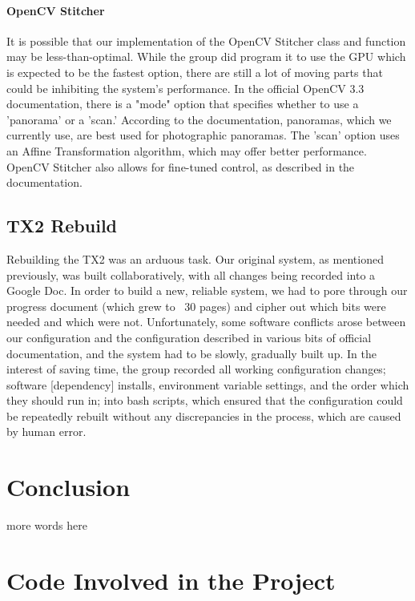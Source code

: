 \documentclass[letterpaper,10pt,serif,draftclsnofoot,onecolumn,compsoc,titlepage]{IEEEtran}
\begin{document}
\paragraph*{OpenCV Stitcher} It is possible that our implementation of the OpenCV Stitcher 
class and function may be less-than-optimal. While the group did program it to use the GPU 
which is expected to be the fastest option, there are still a lot of moving parts that 
could be inhibiting the system's performance. In the official OpenCV 3.3 documentation, 
there is a "mode" option that specifies whether to use a 'panorama' or a 'scan.' According 
to the documentation, panoramas, which we currently 
use, are best used for photographic panoramas. The 'scan' option uses an Affine 
Transformation algorithm, which may offer better performance. OpenCV Stitcher also allows 
for fine-tuned control, as described in the documentation.

\subsection{TX2 Rebuild}
Rebuilding the TX2 was an arduous task. Our original system, as mentioned previously, 
was built collaboratively, with all changes being recorded into a Google Doc. In order 
to build a new, reliable system, we had to pore through our progress document 
(which grew to ~30 pages) and cipher out which bits were needed and which were not. 
Unfortunately, some software conflicts arose between our configuration and the 
configuration described in various bits of official documentation, and the system had 
to be slowly, gradually built up. In the interest of saving time, the group recorded all 
working configuration changes; software [dependency] installs, environment variable 
settings, and the order which they should run in; into bash scripts, which ensured that 
the configuration could be repeatedly rebuilt without any discrepancies in the process, 
which are caused by human error.

\section{Conclusion}

more words here\\

\section{Code Involved in the Project}
\end{document}
